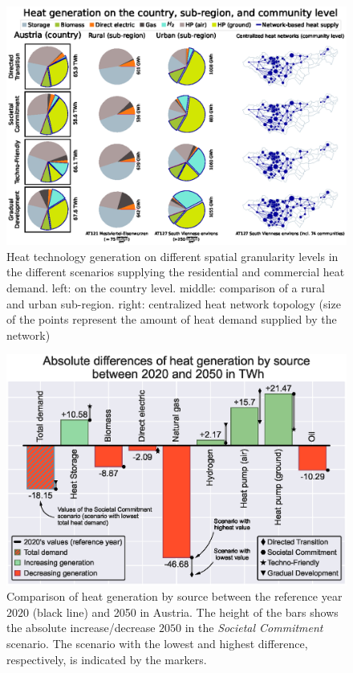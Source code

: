 \begin{figure}
	\centering
	\includegraphics[width=1\linewidth]{figures/4_Results/Fig_Matrix-plot/Spatial_results.eps}
	\caption{Heat technology generation on different spatial granularity levels in the different scenarios supplying the residential and commercial heat demand. left: on the country level. middle: comparison of a rural and urban sub-region. right: centralized heat network topology (size of the points represent the amount of heat demand supplied by the network)}
	\label{fig:res1}
\end{figure}

\begin{figure}
	\centering
	\includegraphics[width=1\linewidth]{figures/4_Results/Fig-Comp/Ref-2050.eps}
	\caption{Comparison of heat generation by source between the reference year $2020$ (black line) and 2050 in Austria. The height of the bars shows the absolute increase/decrease $2050$ in the \textit{Societal Commitment} scenario. The scenario with the lowest and highest difference, respectively, is indicated by the markers.}
	\label{fig:res-comp}
\end{figure}

